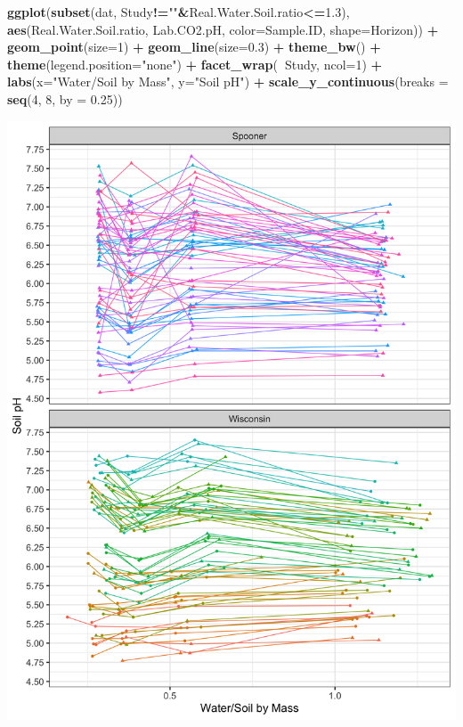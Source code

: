\documentclass[]{article}
\newenvironment{Shaded}{\begin{snugshade}}{\end{snugshade}}
\newcommand{\DataTypeTok}[1]{\textcolor[rgb]{0.13,0.29,0.53}{#1}}
\newcommand{\DecValTok}[1]{\textcolor[rgb]{0.00,0.00,0.81}{#1}}
\newcommand{\FloatTok}[1]{\textcolor[rgb]{0.00,0.00,0.81}{#1}}
\newcommand{\KeywordTok}[1]{\textcolor[rgb]{0.13,0.29,0.53}{\textbf{#1}}}
\newcommand{\NormalTok}[1]{#1}
\newcommand{\OperatorTok}[1]{\textcolor[rgb]{0.81,0.36,0.00}{\textbf{#1}}}
\newcommand{\StringTok}[1]{\textcolor[rgb]{0.31,0.60,0.02}{#1}}
\begin{document}
\begin{Shaded}
\begin{Highlighting}[]
\KeywordTok{ggplot}\NormalTok{(}\KeywordTok{subset}\NormalTok{(dat, Study}\OperatorTok{!=}\StringTok{""}\OperatorTok{&}\NormalTok{Real.Water.Soil.ratio}\OperatorTok{<=}\FloatTok{1.3}\NormalTok{), }\KeywordTok{aes}\NormalTok{(Real.Water.Soil.ratio, Lab.CO2.pH, }\DataTypeTok{color=}\NormalTok{Sample.ID, }\DataTypeTok{shape=}\NormalTok{Horizon)) }\OperatorTok{+}\StringTok{ }
\StringTok{  }\KeywordTok{geom_point}\NormalTok{(}\DataTypeTok{size=}\DecValTok{1}\NormalTok{) }\OperatorTok{+}\StringTok{ }\KeywordTok{geom_line}\NormalTok{(}\DataTypeTok{size=}\FloatTok{0.3}\NormalTok{) }\OperatorTok{+}\StringTok{ }\KeywordTok{theme_bw}\NormalTok{() }\OperatorTok{+}\StringTok{ }\KeywordTok{theme}\NormalTok{(}\DataTypeTok{legend.position=}\StringTok{"none"}\NormalTok{) }\OperatorTok{+}
\StringTok{  }\KeywordTok{facet_wrap}\NormalTok{(}\OperatorTok{~}\NormalTok{Study, }\DataTypeTok{ncol=}\DecValTok{1}\NormalTok{) }\OperatorTok{+}\StringTok{ }\KeywordTok{labs}\NormalTok{(}\DataTypeTok{x=}\StringTok{"Water/Soil by Mass"}\NormalTok{, }\DataTypeTok{y=}\StringTok{"Soil pH"}\NormalTok{) }\OperatorTok{+}\StringTok{ }
\StringTok{  }\KeywordTok{scale_y_continuous}\NormalTok{(}\DataTypeTok{breaks =} \KeywordTok{seq}\NormalTok{(}\DecValTok{4}\NormalTok{, }\DecValTok{8}\NormalTok{, }\DataTypeTok{by =} \FloatTok{0.25}\NormalTok{))}
\end{Highlighting}
\end{Shaded}

\includegraphics{output-rmd/jackson-plot-ph-1.png}
\end{document}

